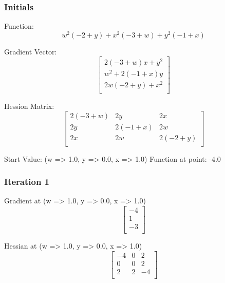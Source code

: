 \documentclass{article}
\begin{document}
\subsubsection{Initials}
Function:
\begin{equation}
w^{2} \left( -2 + y \right) + x^{2} \left( -3 + w \right) + y^{2} \left( -1 + x \right)
\end{equation}

Gradient Vector:
\begin{equation}
\left[
\begin{array}{c}
2 \left( -3 + w \right) x + y^{2} \\
w^{2} + 2 \left( -1 + x \right) y \\
2 w \left( -2 + y \right) + x^{2} \\
\end{array}
\right]
\end{equation}

Hession Matrix:
\begin{equation}
\left[
\begin{array}{ccc}
2 \left( -3 + w \right) & 2 y & 2 x \\
2 y & 2 \left( -1 + x \right) & 2 w \\
2 x & 2 w & 2 \left( -2 + y \right) \\
\end{array}
\right]
\end{equation}

Start Value:
(w => 1.0, y => 0.0, x => 1.0)
Function at point:
-4.0
\subsubsection{Iteration 1}
Gradient at (w => 1.0, y => 0.0, x => 1.0)
\begin{equation}
\left[
\begin{array}{c}
-4 \\
1 \\
-3 \\
\end{array}
\right]
\end{equation}

Hessian at (w => 1.0, y => 0.0, x => 1.0)
\begin{equation}
\left[
\begin{array}{ccc}
-4 & 0 & 2 \\
0 & 0 & 2 \\
2 & 2 & -4 \\
\end{array}
\right]
\end{equation}
\end{document}
